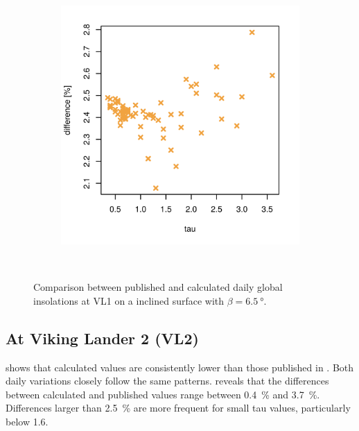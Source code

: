 \begin{figure}[H]
\begin{subfigure}[t]{\subfigureWidth}
            \includegraphics[height=\graphicsHeight]{sections/appendix/insolation-calculation-verification/plots/h-diff-bet-exp-calc-at-vl1-with-beta-65-deg.png}
            \label{fig:sub:comparative-global-insolation-at-vl1-beta-optimal-percentage-differences}
    \end{subfigure}\\[0.8ex]
    \caption{Comparison between published and calculated daily global insolations at \ac{VL1} on a inclined surface with $\beta=\SI{6.5}{\degree}$.}
    \label{fig:plot:comparative-global-insolation-at-vl1-beta-optimal}
\vspace{-2ex}
\end{figure}

\subsection{At Viking Lander 2 (VL2)}
 shows that calculated values are consistently lower than those published in . Both daily variations closely follow the same patterns.  reveals that the differences between calculated and published values range between \SI{0.4}{\percent} and \SI{3.7}{\percent}. Differences larger than \SI{2.5}{\percent} are more frequent for small tau values, particularly below 1.6.

